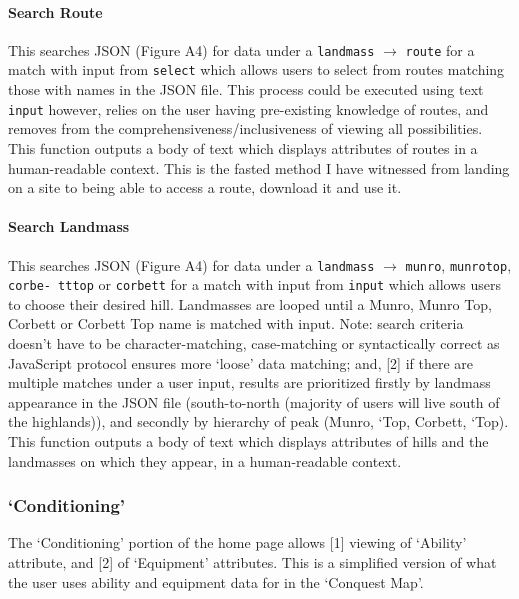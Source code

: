 \documentclass[11pt, english]{article}
\begin{document}
			\paragraph{Search Route}

	This searches JSON (Figure A4) for data under a \texttt{landmass} $\rightarrow$ \texttt{route} for a match with input from \texttt{select} which allows users to select from routes matching those with names in the JSON file. This process could be executed using text \texttt{input} however, relies on the user having pre-existing knowledge of routes, and removes from the comprehensiveness/inclusiveness of viewing all possibilities. This function outputs a body of text which displays attributes of routes in a human-readable context. This is the fasted method I have witnessed from landing on a site to being able to access a route, download it and use it.

			\paragraph{Search Landmass}

	This searches JSON (Figure A4) for data under a \texttt{landmass} $\rightarrow$ \texttt{munro}, \texttt{munrotop}, \texttt{corbe- tttop} or \texttt{corbett} for a match with input from \texttt{input} which allows users to choose their desired hill. Landmasses are looped until a Munro, Munro Top, Corbett or Corbett Top name is matched with input. Note: search criteria doesn't have to be character-matching, case-matching or syntactically correct as JavaScript protocol ensures more `loose' data matching; and, [2] if there are multiple matches under a user input, results are prioritized firstly by landmass appearance in the JSON file (south-to-north (majority of users will live south of the highlands)), and secondly by hierarchy of peak (Munro, `Top, Corbett, `Top). This function outputs a body of text which displays attributes of hills and the landmasses on which they appear, in a human-readable context.

		\subsubsection{`Conditioning'}

	The `Conditioning' portion of the home page allows [1] viewing of `Ability' attribute, and [2] of `Equipment' attributes. This is a simplified version of what the user uses ability and equipment data for in the `Conquest Map'.
\end{document}
